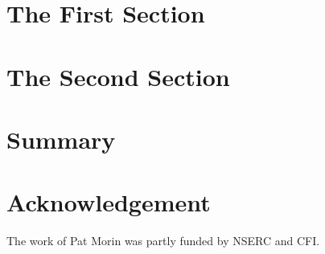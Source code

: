 \documentclass{patmorin}
\DeclareMathOperator{\crs}{cr}
\begin{document}
%
%
%
%
%
%

\section{The First Section}

\section{The Second Section}

\section{Summary}

\section*{Acknowledgement}

The work of Pat Morin was partly funded by NSERC and CFI.



\end{document}
